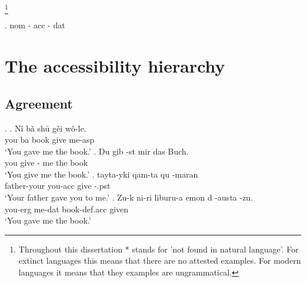 \footnote{Throughout this dissertation * stands for 'not found in natural language'. For extinct languages this means that there are no attested examples. For modern languages it means that they examples are ungrammatical.}



\ex. \ac{nom} - \ac{acc} - \ac{dat}

\phantom{nom}



\section{The accessibility hierarchy}

\subsection{Agreement}

\ex.
\ag. Nǐ bǎ shū gěi wǒ-le.\\
 you ba book give me-\ac{asp}\\
 `You gave me the book.' 
\bg. Du gib -st mir das Buch.\\
 you give - me the book\\
 `You give me the book.' 
\bg. tayta-yki qam-ta qu -maran\\
 father-your you-\ac{acc} give -.\ac{pst}\\
 `Your father gave you to me.' 
\bg. Zu-k ni-ri liburu-a emon d -austa -zu.\\
 you-\ac{erg} me-\ac{dat} book-\ac{def}.\ac{acc} given   \\
 `You gave me the book.' 

